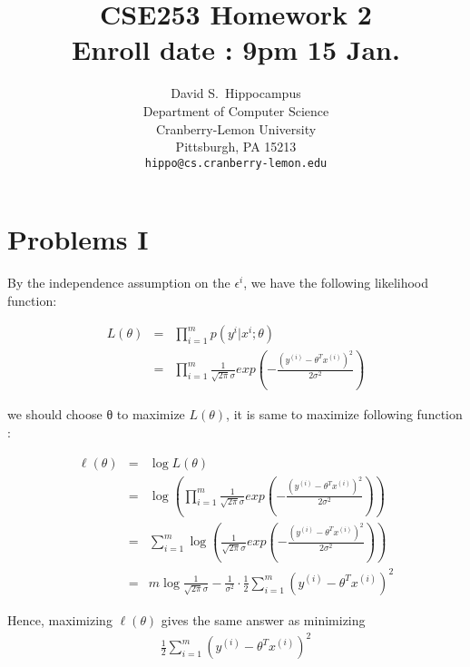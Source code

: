 \documentclass{article} %
\title{CSE253 Homework 2  \\ Enroll date : 9pm 15 Jan. }
\author{
David S.~Hippocampus\\
Department of Computer Science\\
Cranberry-Lemon University\\
Pittsburgh, PA 15213 \\
\texttt{hippo@cs.cranberry-lemon.edu}
}
\begin{document}
\maketitle


\section{Problems I}


By the independence assumption on the $\epsilon^{i}$, we have the following likelihood function:



\begin{equation}
    \begin{array}{rcl}
       L(\theta) & = &  \prod\limits_{i = 1}^{m} p(y^{i} | x^{i} ; \theta)  \\
       & = &  \prod\limits_{i = 1}^{m} \frac{1}{\sqrt{2\pi} \sigma} exp(- \frac{(y^{(i)}   -   \theta^Tx^{(i)}  ) ^ 2}{2\sigma^2})
    \end{array}
\end{equation}

we should choose θ to maximize $L(\theta)$, it is same to maximize following function :

\begin{equation}
    \begin{array}{rcl}
       \ell(\theta) & = & \log{L(\theta)} \\
       & = &  \log {(\prod\limits_{i = 1}^{m} \frac{1}{\sqrt{2\pi} \sigma} exp(- \frac{(y^{(i)}   -   \theta^Tx^{(i)}  ) ^ 2}{2\sigma^2}))} \\
       & = & \sum\limits_{i = 1}^{m} \log {(\frac{1}{\sqrt{2\pi} \sigma} exp(- \frac{(y^{(i)}   -   \theta^Tx^{(i)}  ) ^ 2}{2\sigma^2}))} \\
       & = & m \log{ \frac{1}{\sqrt{2\pi} \sigma}  } - \frac{1}{\sigma^2} \cdot \frac{1}{2} \sum\limits_{i=1}^{m}(   y^{(i)}   -   \theta^Tx^{(i)}   )^2
    \end{array}
\end{equation}

Hence, maximizing $\ell(\theta)$ gives the same answer as minimizing \\

\begin{equation}
    \begin{array}{rcl}
       \frac{1}{2} \sum\limits_{i=1}^{m}(   y^{(i)}   -   \theta^Tx^{(i)}   )^2
    \end{array}
\end{equation}
\end{document}
